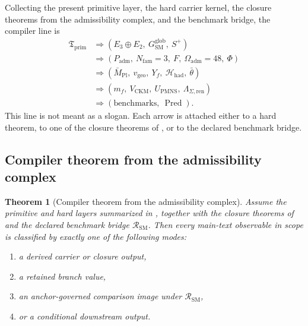 \documentclass[11pt,a4paper]{article}
\newtheorem{theorem}{Theorem}[section]
\theoremstyle{definition}
\theoremstyle{remark}
\newcommand{\Seam}{\Sigma}
\newcommand{\Mpl}{\bar M_{\mathrm{Pl}}}
\newcommand{\SM}{\mathrm{SM}}
\newcommand{\Oadm}{\Omega_{\mathrm{adm}}}
\newcommand{\Hhad}{\mathcal H_{\mathrm{had}}}
\newcommand{\Pred}{\operatorname{Pred}}
\newcommand{\Tprim}{\mathfrak T_{\mathrm{prim}}}
\newcommand{\vgeo}{v_{\mathrm{geo}}}
\newcommand{\Padm}{P_{\mathrm{adm}}}
\begin{document}
Collecting the present primitive layer, the hard carrier kernel, the closure theorems from the admissibility complex, and the benchmark bridge, the compiler line is
\begin{equation}
\label{eq:conditional-compiler-chain}
\begin{aligned}
\Tprim
&\Rightarrow
(E_3\oplus E_2,\ G_{\SM}^{\mathrm{glob}},\ S^+)\\
&\Rightarrow
( \Padm,\ N_{\mathrm{fam}}=3,\ F,\ \Oadm=48,\ \Phi)\\
&\Rightarrow
( \Mpl,\ \vgeo,\ Y_f,\ \Hhad,\ \bar\theta )\\
&\Rightarrow
(m_f,\ V_{\mathrm{CKM}},\ U_{\mathrm{PMNS}},\ \Lambda_{\Seam,\mathrm{ren}})\\
&\Rightarrow
(\text{benchmarks},\ \Pred).
\end{aligned}
\end{equation}
This line is not meant as a slogan. Each arrow is attached either to a hard theorem, to one of the closure theorems of , or to the declared benchmark bridge.

\subsection{Compiler theorem from the admissibility complex}

\begin{theorem}[Compiler theorem from the admissibility complex]
Assume the primitive and hard layers summarized in , together with the closure theorems of  and the declared benchmark bridge $\mathcal R_{\SM}$. Then every main-text observable in scope is classified by exactly one of the following modes:
\begin{enumerate}[label=(\roman*), leftmargin=1.5em, topsep=3pt, itemsep=2pt]
    \item a derived carrier or closure output,
    \item a retained branch value,
    \item an anchor-governed comparison image under $\mathcal R_{\SM}$,
    \item or a conditional downstream output.
\end{enumerate}
\end{theorem}
\end{document}

